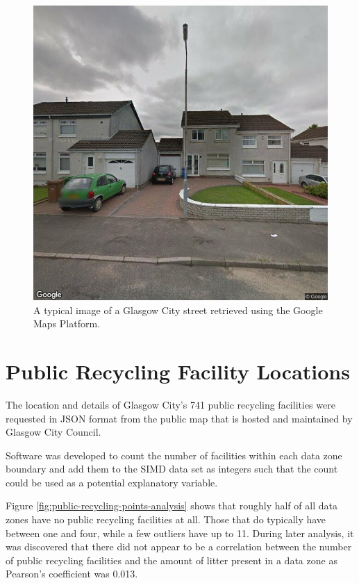 \documentclass{thesis}
\begin{document}
\begin{figure}[h]
    \centering
    \includegraphics[scale=0.4]{images/street-view-image.jpg}
    \caption{A typical image of a Glasgow City street retrieved using the Google Maps Platform.}
    \label{fig:street-view-image}
\end{figure}

\section{Public Recycling Facility Locations}

The location and details of Glasgow City's 741 public recycling facilities were requested in JSON format from the public map that is hosted and maintained by Glasgow City Council.

Software was developed to count the number of facilities within each data zone boundary and add them to the SIMD data set as integers such that the count could be used as a potential explanatory variable.

Figure \ref{fig:public-recycling-points-analysis} shows that roughly half of all data zones have no public recycling facilities at all. Those that do typically have between one and four, while a few outliers have up to 11. During later analysis, it was discovered that there did not appear to be a correlation between the number of public recycling facilities and the amount of litter present in a data zone as Pearson's coefficient was 0.013.
\end{document}
